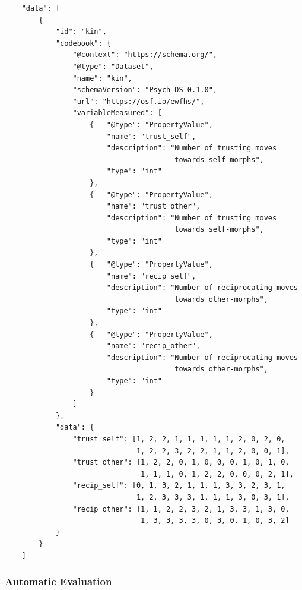 \documentclass[
  english,
  doc,floatsintext]{apa6}
\begin{document}
\begin{tcolorbox}[colback=black!5!white,colframe=white!5!black,title=Box 6. The data component.]
\begin{verbatim}
    "data": [
        {
            "id": "kin",
            "codebook": {
                "@context": "https://schema.org/",
                "@type": "Dataset",
                "name": "kin",
                "schemaVersion": "Psych-DS 0.1.0",
                "url": "https://osf.io/ewfhs/",
                "variableMeasured": [
                    {   "@type": "PropertyValue",
                        "name": "trust_self",
                        "description": "Number of trusting moves
                                        towards self-morphs",
                        "type": "int"
                    },
                    {   "@type": "PropertyValue",
                        "name": "trust_other",
                        "description": "Number of trusting moves
                                        towards self-morphs",
                        "type": "int"
                    },
                    {   "@type": "PropertyValue",
                        "name": "recip_self",
                        "description": "Number of reciprocating moves 
                                        towards other-morphs",
                        "type": "int"
                    },
                    {   "@type": "PropertyValue",
                        "name": "recip_other",
                        "description": "Number of reciprocating moves
                                        towards other-morphs",
                        "type": "int"
                    }
                ]
            },
            "data": {
                "trust_self": [1, 2, 2, 1, 1, 1, 1, 1, 2, 0, 2, 0, 
                               1, 2, 2, 3, 2, 2, 1, 1, 2, 0, 0, 1],
                "trust_other": [1, 2, 2, 0, 1, 0, 0, 0, 1, 0, 1, 0,
                                1, 1, 1, 0, 1, 2, 2, 0, 0, 0, 2, 1],
                "recip_self": [0, 1, 3, 2, 1, 1, 1, 3, 3, 2, 3, 1,
                               1, 2, 3, 3, 3, 1, 1, 1, 3, 0, 3, 1],
                "recip_other": [1, 1, 2, 2, 3, 2, 1, 3, 3, 1, 3, 0,
                                1, 3, 3, 3, 3, 0, 3, 0, 1, 0, 3, 2]
            }
        }
    ]
\end{verbatim}
\end{tcolorbox}

\hypertarget{automatic-evaluation}{%
\subsubsection{Automatic Evaluation}\label{automatic-evaluation}}
\end{document}
